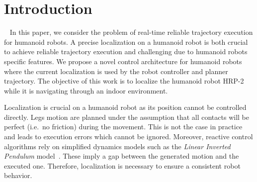 \section{Introduction}~\label{sec:introduction}
In this paper, we consider the problem of real-time reliable trajectory execution for humanoid robots. A precise localization on a humanoid robot is both crucial to achieve reliable trajectory execution and challenging due to humanoid robots specific features. We propose a novel control architecture for humanoid robots where the current localization is used by the robot controller and planner trajectory. The objective of this work is to localize the humanoid robot HRP-2~\cite{Kaneko04icra} while it is navigating through an indoor environment.

Localization is crucial on a humanoid robot as its position cannot be controlled directly. Legs motion are planned under the assumption that all contacts will be perfect (i.e.\ no friction) during the movement. This is not the case in practice and leads to execution errors which cannot be ignored. Moreover, reactive control
algorithms rely on simplified dynamics models such as the \textit{Linear Inverted Pendulum} model~\cite{Kajita01iros}. These imply a gap between the generated motion and the executed one. Therefore, localization is necessary to ensure a consistent robot behavior.

